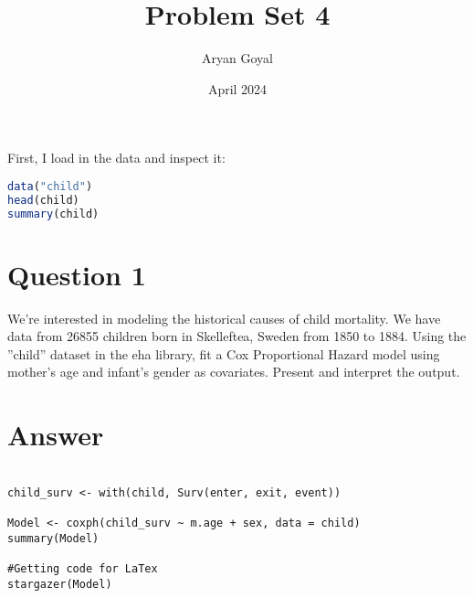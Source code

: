 \documentclass{article}
\title{Problem Set 4}
\author{Aryan Goyal}
\date{April 2024}
\begin{document}
\maketitle

First, I load in the data and inspect it:

\begin{lstlisting}[language=R]
data("child")
head(child)
summary(child)    
\end{lstlisting}
    
\section{Question 1}

We’re interested in modeling the historical causes of child mortality. We 
have data from 26855 children born in Skelleftea, Sweden from 1850 to 
1884. Using the ”child” dataset in the eha library, fit a Cox 
Proportional Hazard model using mother’s age and infant’s gender
as covariates. Present and interpret the output.

\section{Answer}

\begin{lstlisting}

child_surv <- with(child, Surv(enter, exit, event))

Model <- coxph(child_surv ~ m.age + sex, data = child)
summary(Model)

#Getting code for LaTex
stargazer(Model)
\end{lstlisting}
\end{document}
